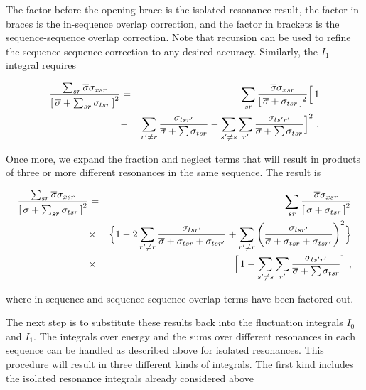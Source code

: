 \noindent
The factor before the opening brace is the isolated
resonance result, the factor in braces is the in-sequence
overlap correction, and the factor in brackets is the
sequence-sequence overlap correction.
Note that recursion can be used to refine the sequence-sequence correction
to any desired accuracy.  Similarly, the $I_1$ integral requires

\begin{eqnarray}
   \frac{\sum_{sr}\overline{\sigma}\sigma_{xsr}}
     {\left[\,\overline{\sigma}+\sum_{sr}\sigma_{tsr}\,\right]^2}
   &=&\sum_{sr}
     \frac{\overline{\sigma}\sigma_{xsr}}
      {[\,\overline{\sigma}+\sigma_{tsr}\,]^2} \Bigl[ \,1 \nonumber\\
   &-&\sum_{r'{\neq}r}\frac{\sigma_{tsr'}}
      {\overline{\sigma}+\sum\sigma_{tsr}}
      -\sum_{s'\neq s}\sum_{r'}\frac{\sigma_{ts'r'}}
         {\overline{\sigma}+\sum\sigma_{tsr}} \Bigr]^2\,\,.
\end{eqnarray}

\noindent
Once more, we expand the fraction and neglect terms that will result
in products of three or more different resonances in the
same sequence.  The result is

\begin{eqnarray}
   \frac{\sum_{sr}\overline{\sigma}\sigma_{xsr}}
     {\left[\,\overline{\sigma}+\sum_{sr}\sigma_{tsr}\,\right]^2}
   &=&\sum_{sr}
     \frac{\overline{\sigma}\sigma_{xsr}}
      {\left[\,\overline{\sigma}+\sigma_{tsr}\,\right]^2} \nonumber\\
   &\times&\Bigl\{1-2\sum_{r'{\neq}r}\frac{\sigma_{tsr'}}
      {\overline{\sigma}+\sigma_{tsr}+\sigma_{tsr'}}
     +\sum_{r'{\neq}r}\left(\frac{\sigma_{tsr'}}
      {\overline{\sigma}+\sigma_{tsr}+\sigma_{tsr'}}\right)^2\Bigr\}
       \nonumber\\
   &\times& \Bigl[\,1-\sum_{s'\neq s}\sum_{r'}\frac{\sigma_{ts'r'}}
         {\overline{\sigma}+\sum\sigma_{tsr}}\Bigr]\,\,,
\end{eqnarray}

\noindent
where in-sequence and sequence-sequence overlap
terms have been factored out.

The next step is to substitute these results back into the fluctuation
integrals $I_0$ and $I_1$.  The integrals over energy and the sums over
different resonances in each sequence can be handled as described
above for isolated resonances.  This procedure will result in three
different kinds of integrals.  The first kind includes the isolated
resonance integrals already considered above

